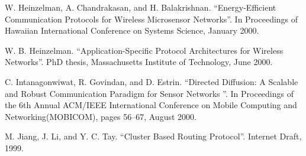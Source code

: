 \documentclass[journal]{IEEEtran}
\begin{document}
\begin{CJK}{UTF8}{gbsn}
\begin{thebibliography}{1}
W. Heinzelman, A. Chandrakasan, and H. Balakrishnan. “Energy-Efficient Communication Protocols for Wireless
Microsensor Networks”. In Proceedings of Hawaiian International
Conference on Systems Science, January 2000.

W. B. Heinzelman. “Application-Specific Protocol Architectures
for Wireless Networks”. PhD thesis, Massachusetts
Institute of Technology, June 2000.

C. Intanagonwiwat, R. Govindan, and D. Estrin. “Directed
Diffusion: A Scalable and Robust Communication
Paradigm for Sensor Networks ”. In Proceedings of the
6th Annual ACM/IEEE International Conference on Mobile
Computing and Networking(MOBICOM), pages 56–67, August
2000.

M. Jiang, J. Li, and Y. C. Tay. “Cluster Based Routing Protocol”.
Internet Draft, 1999.

\end{thebibliography}



% 





\end{CJK}
\end{document}
